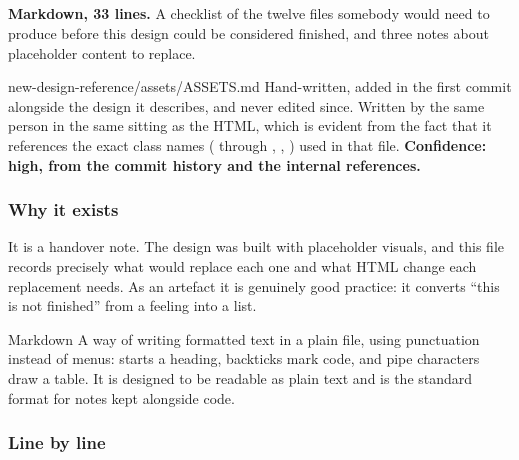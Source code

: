 \subsection{}

\textbf{Markdown, 33 lines.} A checklist of the twelve files somebody would need
to produce before this design could be considered finished, and three notes about
placeholder content to replace.

\begin{provenance}{new-design-reference/assets/ASSETS.md}
Hand-written, added in the first commit  alongside the design it
describes, and never edited since. Written by the same person in the same sitting
as the HTML, which is evident from the fact that it references the exact class
names ( through , , ) used in that file.
\textbf{Confidence: high, from the commit history and the internal references.}
\end{provenance}

\subsubsection*{Why it exists}

It is a handover note. The design was built with placeholder visuals, and this
file records precisely what would replace each one and what HTML change each
replacement needs. As an artefact it is genuinely good practice: it converts
``this is not finished'' from a feeling into a list.

\begin{jargon}{Markdown}
A way of writing formatted text in a plain file, using punctuation instead of
menus: \code{\#} starts a heading, backticks mark code, and pipe characters draw a
table. It is designed to be readable as plain text and is the standard format for
notes kept alongside code.
\end{jargon}

\subsubsection*{Line by line}

